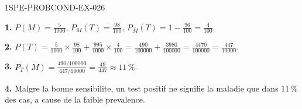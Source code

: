 \begin{corrige}{1SPE-PROBCOND-EX-026}

\textbf{1.} $P(M) = \frac{5}{1000}$, $P_M(T) = \frac{98}{100}$, $P_{\overline{M}}(T) = 1 - \frac{96}{100} = \frac{4}{100}$.

\textbf{2.} $P(T) = \frac{5}{1000}\times\frac{98}{100} + \frac{995}{1000}\times\frac{4}{100} = \frac{490}{100000}+\frac{3980}{100000} = \frac{4470}{100000} = \frac{447}{10000}$.

\textbf{3.} $P_T(M) = \frac{490/100000}{447/10000} = \frac{49}{447} \approx 11\,\%$.

\textbf{4.} Malgre la bonne sensibilite, un test positif ne signifie la maladie que dans $11\,\%$ des cas, a cause de la faible prevalence.

\end{corrige}
